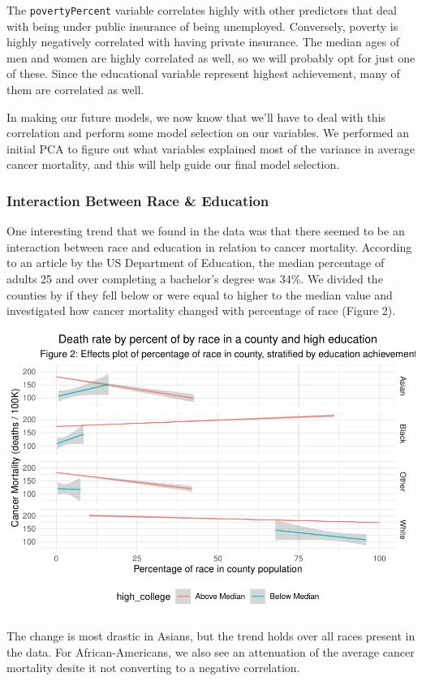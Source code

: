 \documentclass[
  11pt,
]{article}
\begin{document}
The \texttt{povertyPercent} variable correlates highly with other
predictors that deal with being under public insurance of being
unemployed. Conversely, poverty is highly negatively correlated with
having private insurance. The median ages of men and women are highly
correlated as well, so we will probably opt for just one of these. Since
the educational variable represent highest achievement, many of them are
correlated as well.

In making our future models, we now know that we'll have to deal with
this correlation and perform some model selection on our variables. We
performed an initial PCA to figure out what variables explained most of
the variance in average cancer mortality, and this will help guide our
final model selection.

\hypertarget{interaction-between-race-education}{%
\subsubsection{Interaction Between Race \&
Education}\label{interaction-between-race-education}}

One interesting trend that we found in the data was that there seemed to
be an interaction between race and education in relation to cancer
mortality. According to an article by the US Department of Education,
the median percentage of adults 25 and over completing a bachelor's
degree was 34\%. We divided the counties by if they fell below or were
equal to higher to the median value and investigated how cancer
mortality changed with percentage of race (Figure 2).

\begin{center}\includegraphics[width=0.7\linewidth]{report_files/figure-latex/unnamed-chunk-3-1} \end{center}

The change is most drastic in Asians, but the trend holds over all races
present in the data. For African-Americans, we also see an attenuation
of the average cancer mortality desite it not converting to a negative
correlation.
\end{document}
